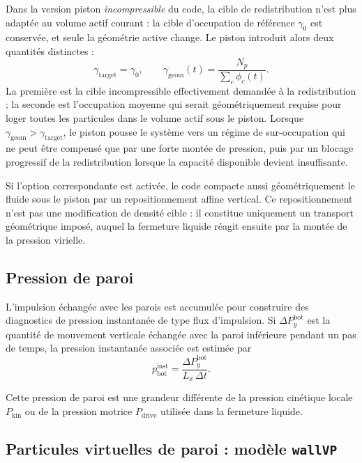 \documentclass[11pt,a4paper]{article}
\begin{document}
Dans la version piston \emph{incompressible} du code, la cible de redistribution n'est plus adaptée au volume actif courant : la cible d'occupation de référence \(\gamma_0\) est conservée, et seule la géométrie active change. Le piston introduit alors deux quantités distinctes :
\begin{equation}
 \gamma_{\mathrm{target}} = \gamma_0,
 \qquad
 \gamma_{\mathrm{geom}}(t)=\frac{N_p}{\sum_c \phi_c(t)}.
\end{equation}
La première est la cible incompressible effectivement demandée à la redistribution ; la seconde est l'occupation moyenne qui serait géométriquement requise pour loger toutes les particules dans le volume actif sous le piston. Lorsque \(\gamma_{\mathrm{geom}}>\gamma_{\mathrm{target}}\), le piston pousse le système vers un régime de sur-occupation qui ne peut être compensé que par une forte montée de pression, puis par un blocage progressif de la redistribution lorsque la capacité disponible devient insuffisante.

Si l'option correspondante est activée, le code compacte aussi géométriquement le fluide sous le piston par un repositionnement affine vertical. Ce repositionnement n'est pas une modification de densité cible : il constitue uniquement un transport géométrique imposé, auquel la fermeture liquide réagit ensuite par la montée de la pression virielle.

\subsection{Pression de paroi}

L'impulsion échangée avec les parois est accumulée pour construire des diagnostics de pression instantanée de type flux d'impulsion. Si $\Delta P_y^{\mathrm{bot}}$ est la quantité de mouvement verticale échangée avec la paroi inférieure pendant un pas de temps, la pression instantanée associée est estimée par
\begin{equation}
 p_{\mathrm{bot}}^{\mathrm{inst}} = \frac{\Delta P_y^{\mathrm{bot}}}{L_x\,\Delta t}.
\end{equation}

Cette pression de paroi est une grandeur différente de la pression cinétique locale $P_{\mathrm{kin}}$ ou de la pression motrice $P_{\mathrm{drive}}$ utilisée dans la fermeture liquide.


\subsection{Particules virtuelles de paroi : modèle \texttt{wallVP}}
\end{document}
